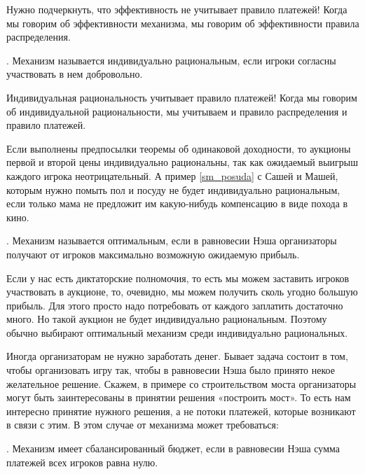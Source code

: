 Нужно подчеркнуть, что эффективность не учитывает правило платежей! Когда мы говорим об эффективности механизма, мы говорим об эффективности правила распределения.

\begin{mydef}
. Механизм называется индивидуально рациональным, если игроки согласны участвовать в нем добровольно.
\end{mydef}

Индивидуальная рациональность учитывает правило платежей! Когда мы говорим об индивидуальной рациональности, мы учитываем и правило распределения и правило платежей.

\begin{myex} Если выполнены предпосылки теоремы об одинаковой доходности, то аукционы первой и второй цены индивидуально рациональны, так как ожидаемый выигрыш каждого игрока неотрицательный. А пример \ref{sm_posuda} с Сашей и Машей, которым нужно помыть пол и посуду не будет индивидуально рациональным, если только мама не предложит им какую-нибудь компенсацию в виде похода в кино.
\end{myex}

\begin{mydef} . Механизм называется оптимальным, если в равновесии Нэша организаторы получают от игроков максимально возможную ожидаемую прибыль.
\end{mydef}

Если у нас есть диктаторские полномочия, то есть мы можем заставить игроков участвовать в аукционе, то, очевидно, мы можем получить сколь угодно большую прибыль. Для этого просто надо потребовать от каждого заплатить достаточно много. Но такой аукцион не будет индивидуально рациональным. Поэтому обычно выбирают оптимальный механизм среди индивидуально рациональных.

Иногда организаторам не нужно заработать денег. Бывает задача состоит в том, чтобы организовать игру так, чтобы в равновесии Нэша было принято некое желательное решение. Скажем, в примере со строительством моста организаторы могут быть заинтересованы в принятии решения «построить мост». То есть нам интересно принятие нужного решения, а не потоки платежей, которые возникают в связи с этим. В этом случае от механизма может требоваться:

\begin{mydef} . Механизм имеет сбалансированный бюджет, если в равновесии Нэша сумма платежей всех игроков равна нулю.
\end{mydef}

